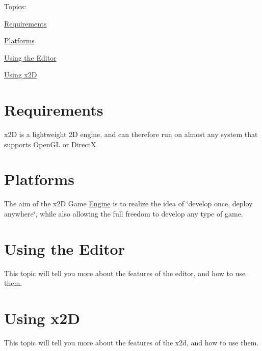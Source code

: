 Topics\+:
\begin{DoxyItemize}
\item \hyperlink{require}{Requirements}
\item \hyperlink{platforms}{Platforms}
\item \hyperlink{using_editor}{Using the Editor}
\item \hyperlink{using_x2d}{Using x2\+D} 
\end{DoxyItemize}\hypertarget{require}{}\section{Requirements}\label{require}
x2\+D is a lightweight 2\+D engine, and can therefore run on almost any system that supports Open\+G\+L or Direct\+X. \hypertarget{platforms}{}\section{Platforms}\label{platforms}
The aim of the x2\+D Game \hyperlink{class_engine}{Engine} is to realize the idea of \char`\"{}develop once, deploy anywhere\char`\"{}, while also allowing the full freedom to develop any type of game. \hypertarget{using_editor}{}\section{Using the Editor}\label{using_editor}
This topic will tell you more about the features of the editor, and how to use them. \hypertarget{using_x2d}{}\section{Using x2\+D}\label{using_x2d}
This topic will tell you more about the features of the x2d, and how to use them. 